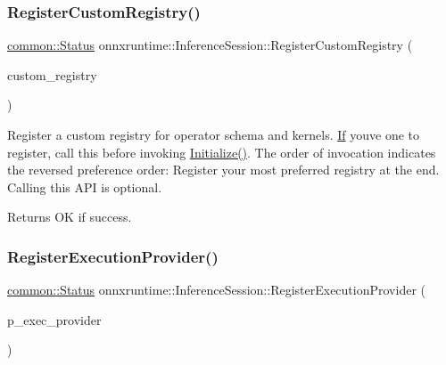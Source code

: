 \subsubsection{\texorpdfstring{Register\+Custom\+Registry()}{RegisterCustomRegistry()}}
{\footnotesize\ttfamily \mbox{\hyperlink{classonnxruntime_1_1common_1_1Status}{common\+::\+Status}} onnxruntime\+::\+Inference\+Session\+::\+Register\+Custom\+Registry (\begin{DoxyParamCaption}\item[{std\+::shared\+\_\+ptr$<$ \mbox{\hyperlink{classonnxruntime_1_1CustomRegistry}{Custom\+Registry}} $>$}]{custom\+\_\+registry }\end{DoxyParamCaption})}

Register a custom registry for operator schema and kernels. \mbox{\hyperlink{classonnxruntime_1_1If}{If}} you\textquotesingle{}ve one to register, call this before invoking \mbox{\hyperlink{classonnxruntime_1_1InferenceSession_aef2b179e956c7450ccf22d0be3374b6e}{Initialize()}}. The order of invocation indicates the reversed preference order\+: Register your most preferred registry at the end. Calling this A\+PI is optional. \begin{DoxyReturn}{Returns}
OK if success. 
\end{DoxyReturn}
\mbox{\label{classonnxruntime_1_1InferenceSession_a85f935178f4bcd8de35e36a2a9e84669}} 
\subsubsection{\texorpdfstring{Register\+Execution\+Provider()}{RegisterExecutionProvider()}}
{\footnotesize\ttfamily \mbox{\hyperlink{classonnxruntime_1_1common_1_1Status}{common\+::\+Status}} onnxruntime\+::\+Inference\+Session\+::\+Register\+Execution\+Provider (\begin{DoxyParamCaption}\item[{std\+::unique\+\_\+ptr$<$ \mbox{\hyperlink{classonnxruntime_1_1IExecutionProvider}{I\+Execution\+Provider}} $>$}]{p\+\_\+exec\+\_\+provider }\end{DoxyParamCaption})}

